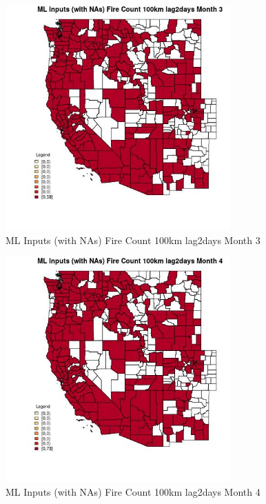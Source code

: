\begin{figure} 
\centering  
\includegraphics[width=0.77\textwidth]{Code_Outputs/Report_ML_input_PM25_Step4_part_e_de_duplicated_aves_compiled_2019-05-21wNAs_CountyFire_Count_100km_lag2daysmedianMonth3.jpg} 
\caption{\label{fig:Report_ML_input_PM25_Step4_part_e_de_duplicated_aves_compiled_2019-05-21wNAsCountyFire_Count_100km_lag2daysmedianMonth3}ML Inputs (with NAs) Fire Count 100km lag2days Month 3} 
\end{figure} 
 

\begin{figure} 
\centering  
\includegraphics[width=0.77\textwidth]{Code_Outputs/Report_ML_input_PM25_Step4_part_e_de_duplicated_aves_compiled_2019-05-21wNAs_CountyFire_Count_100km_lag2daysmedianMonth4.jpg} 
\caption{\label{fig:Report_ML_input_PM25_Step4_part_e_de_duplicated_aves_compiled_2019-05-21wNAsCountyFire_Count_100km_lag2daysmedianMonth4}ML Inputs (with NAs) Fire Count 100km lag2days Month 4} 
\end{figure} 
 

